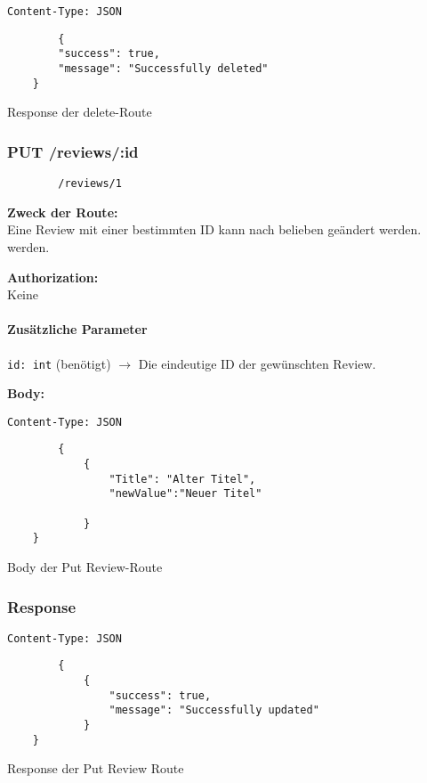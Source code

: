 \begin{code}
    \lstinline{Content-Type: JSON}
    \begin{lstlisting}
        {
        "success": true,
        "message": "Successfully deleted"
    }
    \end{lstlisting}
    \caption{Response der delete-Route}
\end{code}

\pagebreak


\subsubsection{PUT /reviews/:id}

\begin{lstlisting}
        /reviews/1
    \end{lstlisting}


\textbf{Zweck der Route:} \\
Eine Review mit einer bestimmten ID kann nach belieben geändert werden.
werden.

\textbf{Authorization:} \\
Keine

\paragraph{Zusätzliche Parameter}
\lstinline{id: int} (benötigt)
$\rightarrow$ Die eindeutige ID der gewünschten Review.

\textbf{Body:}\\
\begin{code}
    \lstinline{Content-Type: JSON}
    \begin{lstlisting}
        {
            {
                "Title": "Alter Titel",
                "newValue":"Neuer Titel"
    
            }
    }
    \end{lstlisting}
    \caption{Body der Put Review-Route}
\end{code}

\subsubsection{Response}
\begin{code}
    \lstinline{Content-Type: JSON}
    \begin{lstlisting}
        {
            {
                "success": true,
                "message": "Successfully updated"
            }
    }
    \end{lstlisting}
    \caption{Response der Put Review Route}
\end{code}


\pagebreak


